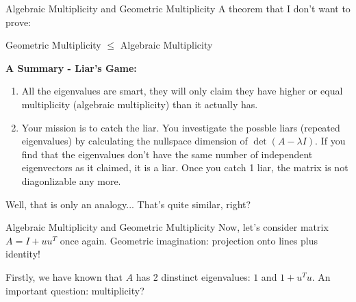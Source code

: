 \documentclass{beamer}
\begin{document}
\begin{frame}{Algebraic Multiplicity and Geometric Multiplicity}
A theorem that I don't want to prove:
\begin{center}
    Geometric Multiplicity $\leq $ Algebraic Multiplicity
\end{center}

\textbf{A Summary - Liar's Game:}
\begin{enumerate}
    \item All the eigenvalues are smart, they will only claim they have higher or equal multiplicity (algebraic multiplicity) than it actually has.
    \item Your mission is to catch the liar. You investigate the possble liars (repeated eigenvalues) by calculating the nullspace dimension of $\det (A-\lambda I)$. If you find that the eigenvalues don't have the same number of independent eigenvectors as it claimed, it is a liar. Once you catch 1 liar, the matrix is not diagonlizable any more.
\end{enumerate}

Well, that is only an analogy... That's quite similar, right?
\end{frame}

\begin{frame}{Algebraic Multiplicity and Geometric Multiplicity}
Now, let's consider matrix $A=I+uu^T$ once again. Geometric imagination: projection onto lines plus identity!

\vspace{3pt}
Firstly, we have known that $A$ has 2 dinstinct eigenvalues: $1$ and $1+u^Tu$. An important question: multiplicity?
\end{frame}
\end{document}

